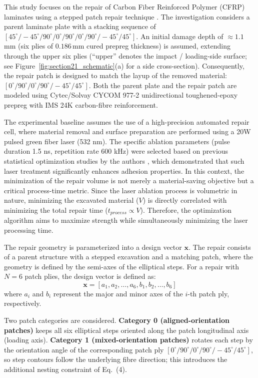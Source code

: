 \documentclass[
  preprint,
  12pt,
  a4paper
]{elsarticle}
\newcommand{\new}[1]{#1}
\begin{document}
This study focuses on the repair of Carbon Fiber Reinforced Polymer (CFRP) laminates using a stepped patch repair technique \cite{psarras2024design}. The investigation considers a parent laminate plate with a stacking sequence of $[45^\circ/-45^\circ/90^\circ/0^\circ/90^\circ/0^\circ/90^\circ/-45^\circ/45^\circ]$. An initial damage depth of \new{$\approx 1.1$\,mm (six plies of $0.186$\,mm cured prepreg thickness)} is assumed, extending through the upper six plies \new{(``upper'' denotes the impact / loading-side surface; see Figure~\ref{fig:section21_schematic}(a) for a side cross-section)}. Consequently, the repair patch is designed to match the layup of the removed material: $[0^\circ/90^\circ/0^\circ/90^\circ/-45^\circ/45^\circ]$. Both the parent plate and the repair patch are modeled using \new{Cytec/Solvay CYCOM 977-2 unidirectional toughened-epoxy prepreg with IMS 24K carbon-fibre reinforcement}.

The experimental baseline assumes the use of a high-precision automated repair cell, where material removal and surface preparation are performed using a 20W pulsed green fiber laser (532 nm). The specific ablation parameters (pulse duration 1.5 ns, repetition rate 600 kHz) were selected based on previous statistical optimization studies by the authors \cite{psarras2020evaluating}, which demonstrated that such laser treatment significantly enhances adhesion properties. In this context, the minimization of the repair volume is not merely a material-saving objective but a critical \new{process-time} metric. Since the laser ablation process is volumetric in nature, minimizing the excavated material ($V$) is directly correlated with minimizing the total repair time ($t_{process} \propto V$). Therefore, the optimization algorithm aims to maximize strength while simultaneously minimizing the laser processing time.

\new{The repair geometry is parameterized into a design vector $\mathbf{x}$.} The repair consists of a parent structure with a stepped excavation and a matching patch, where the geometry is defined by the semi-axes of the elliptical steps. For a repair with $N=6$ \new{patch plies}, the design vector is defined as:
\begin{equation}
    \mathbf{x} = [a_1, a_2, \dots, a_6, b_1, b_2, \dots, b_6]
\end{equation}
where $a_i$ and $b_i$ represent the major and minor axes of the $i$-th \new{patch ply}, respectively.

\new{Two patch categories are considered. \textbf{Category 0 (aligned-orientation patches)} keeps all six elliptical steps oriented along the patch longitudinal axis (loading axis). \textbf{Category 1 (mixed-orientation patches)} rotates each step by the orientation angle of the corresponding patch ply $[0^\circ/90^\circ/0^\circ/90^\circ/-45^\circ/45^\circ]$, so step contours follow the underlying fibre direction; this introduces the additional nesting constraint of Eq.~(4).}
\end{document}
